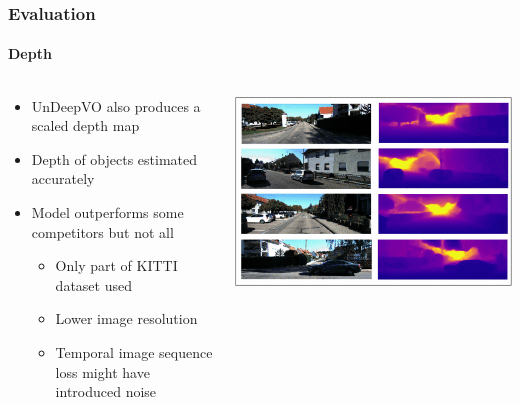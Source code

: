 \begin{frame}
    \frametitle{Evaluation}
    \framesubtitle{Depth}
	       \begin{columns}
	       	\begin{column}{0.45\textwidth}
	       		\begin{itemize}
	       			\item UnDeepVO also produces a scaled depth map 
	       			\item Depth of objects estimated accurately
	       			\item Model outperforms some competitors but not all
	       			\begin{itemize}
	       				\item Only part of KITTI dataset used
	       				\item Lower image resolution
	       				\item Temporal image sequence loss might have introduced noise
	       			\end{itemize}
	       				       			
	       		\end{itemize}
	       	\end{column}
	       	\begin{column}{0.53\textwidth}
	       		\includegraphics[width=\linewidth]{images/depth_estimation.png}
	       	\end{column}
	       \end{columns} \end{frame}
